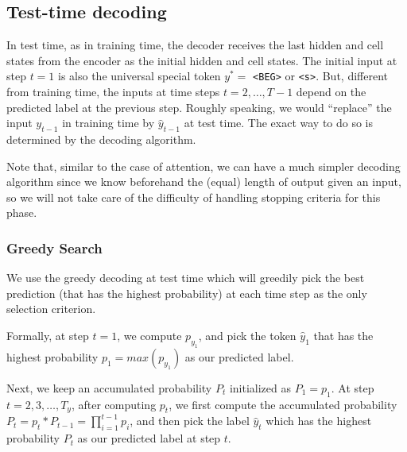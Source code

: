 \documentclass[11pt,a4paper]{article}
\begin{document}



\subsection{Test-time decoding}

In test time, as in training time, the decoder receives the last hidden and cell states from the encoder as the initial hidden and cell states. The initial input at step $t = 1$ is also the universal special token $y^* =$ \texttt{<BEG>} or \texttt{<s>}. But, different from training time, the inputs at time steps $t = 2, \dots, T - 1$ depend on the predicted label at the previous step. Roughly speaking, we would ``replace'' the input $y_{t-1}$ in training time by $\hat{y}_{t-1}$ at test time. The exact way to do so is determined by the decoding algorithm.

Note that, similar to the case of attention, we can have a much simpler decoding algorithm since we know beforehand the (equal) length of output given an input, so we will not take care of the difficulty of handling stopping criteria for this phase.  

\subsubsection{Greedy Search}
We use the greedy decoding at test time which will greedily pick the best prediction (that has the highest probability) at each time step as the only selection criterion. 

Formally, at step $t=1$, we compute $p_{y_1}$, and pick the token $\hat{y}_1$ that has the highest probability $p_1 = max(p_{y_1})$ as our predicted label. 

Next, we keep an accumulated probability $P_t$ initialized as $P_1 = p_1$. At step $t = 2, 3, \dots, T_y$, after computing $p_t$, we first compute the accumulated probability $P_t = p_t * P_{t-1} = \prod_{i=1}^{t-1} p_i$, and then pick the label $\hat{y}_t$ which has the highest probability $P_t$ as our predicted label at step $t$. 
\end{document}
